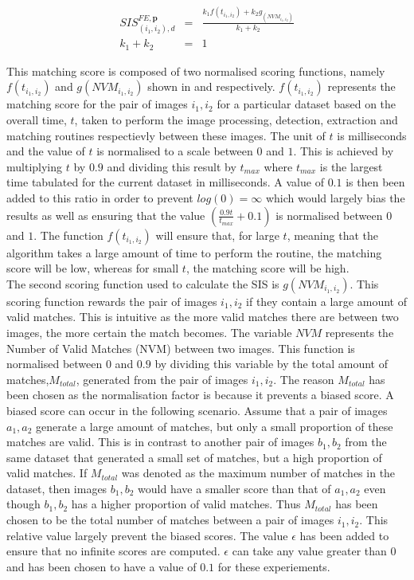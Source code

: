 \documentclass{article}
\begin{document}
\begin{eqnarray}
SIS_{(i_1, i_2), d}^{FE, \textbf{p}} &=& \frac{k_1 f(t_{i_1,i_2}) + k_2 g_(\textit{NVM}_{i_1,i_2})}{k_1 + k_2} \\
k_1 + k_2 &=& 1  
\label{eqn:optimalParameters}
\end{eqnarray}

This matching score is composed of two normalised scoring functions, namely $f(t_{i_1, i_2})$ and $g(NVM_{i_1, i_2})$ shown in  and  respectively. $f(t_{i_1, i_2})$ represents the matching score for the pair of images $i_1, i_2$ for a particular dataset based on the overall time, $t$, taken to perform the image processing, detection, extraction and matching routines respectievly between these images. The unit of $t$ is milliseconds and the value of $t$ is normalised to a scale between $0$ and $1$. This is achieved by multiplying $t$ by $0.9$ and dividing this result by $t_{max}$ where $t_{max}$ is the largest time tabulated for the current dataset in milliseconds. A value of $0.1$ is then been added to this ratio in order to  prevent $log(0) = \infty$ which would largely bias the results as well as ensuring that the value $(\frac{0.9 t}{t_{max}} + 0.1)$ is normalised between $0$ and $1$. The function $f(t_{i_1, i_2})$ will ensure that, for large $t$, meaning that the algorithm takes a large amount of time to perform the routine, the matching score will be low, whereas for small $t$, the matching score will be high. \\

The second scoring function used to calculate the SIS is $g(NVM_{i_1, i_2})$. This scoring function rewards the pair of images $i_1, i_2$ if they contain a large amount of valid matches. This is intuitive as the more valid matches there are between two images, the more certain the match becomes. The variable $NVM$ represents the Number of Valid Matches (NVM) between two images. This function is normalised between $0$ and  $0.9$ by dividing this variable by the total amount of matches,$M_{total}$, generated from the pair of images $i_1, i_2$. The reason $M_{total}$ has been chosen as the normalisation factor is because it prevents a biased score. A biased score can occur in the following scenario. Assume that a pair of images $a_1, a_2$ generate a large amount of matches, but only a small proportion of these matches are valid. This is in contrast to another pair of images $b_1, b_2$ from the same dataset that generated a small set of matches, but a high proportion of valid matches. If $M_{total}$ was denoted as the maximum number of matches in the dataset, then images $b_1, b_2$ would have a smaller score than that of $a_1, a_2$ even though $b_1, b_2$ has a higher proportion of valid matches. Thus $M_{total}$ has been chosen to be the total number of matches between a pair of images $i_1, i_2$. This relative value largely prevent the biased scores. The value $\epsilon$ has been added to ensure that no infinite scores are computed. $\epsilon$ can take any value greater than $0$ and has been chosen to have a value of $0.1$ for these experiements.\\ 
\end{document}
